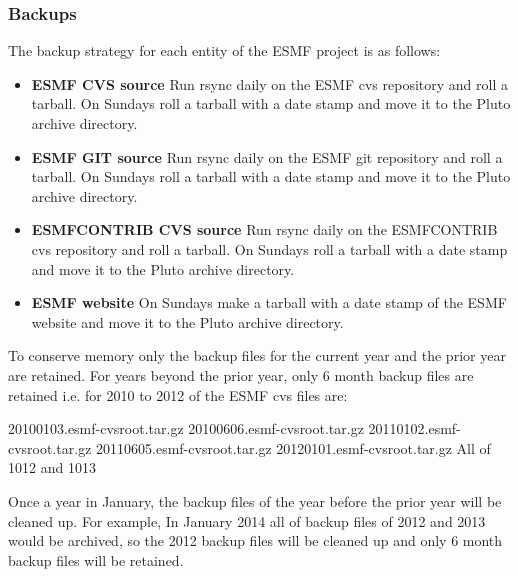 \subsubsection{Backups}

The backup strategy for each entity of the ESMF project is as follows:

\begin{itemize}
\item {\bf ESMF CVS source}\newline
Run rsync daily on the ESMF cvs repository and roll a tarball.
On Sundays roll a tarball with a date stamp and move it to the Pluto archive directory.

\item {\bf ESMF GIT source}\newline
Run rsync daily on the ESMF git repository and roll a tarball.
On Sundays roll a tarball with a date stamp and move it to the Pluto archive directory.

\item {\bf ESMFCONTRIB CVS source}\newline
Run rsync daily on the ESMFCONTRIB cvs repository and roll a tarball.
On Sundays roll a tarball with a date stamp and move it to the Pluto archive directory.

\item {\bf ESMF website}\newline
On Sundays make a tarball with a date stamp of the ESMF website and move it to the Pluto archive directory.
\end{itemize}

To conserve memory only the backup files for the current year and the prior year are retained. For years beyond the prior year, only 6 month backup files are retained i.e. for 2010 to 2012 of the ESMF cvs files are:

20100103.esmf-cvsroot.tar.gz\newline
20100606.esmf-cvsroot.tar.gz\newline
20110102.esmf-cvsroot.tar.gz\newline
20110605.esmf-cvsroot.tar.gz\newline
20120101.esmf-cvsroot.tar.gz\newline
All of 1012 and 1013\newline

Once a year in January, the backup files of the year before the prior year will be cleaned up. For example, In January 2014 all of backup files of 2012 and 2013 would be archived, so the 2012 backup files will be cleaned up and only 6 month backup files will be retained.










